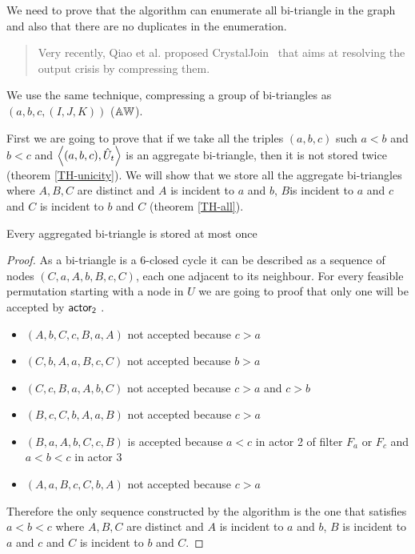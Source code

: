 We need to prove that the algorithm can enumerate all bi-triangle in the graph and also that there are no duplicates in the enumeration.

\begin{quote}
Very recently, Qiao
et al. proposed CrystalJoin~\cite{Lai} that aims at resolving the
output crisis by compressing them.
\end{quote}

We use the same technique, compressing a group of bi-triangles as $(a,b,c,(I,J,K))$ ($\mathbb{AW}$). 
 

First we are going to prove that if we take all the triples $(a,b,c)$  such $a<b$ and $b<c$  and   $\left\langle (a, b,c), \hat{U}_t \right\rangle$ is an aggregate  bi-triangle, then it is not stored twice (theorem \ref{TH-unicity}).  We will show that we  store all the aggregate bi-triangles  where $A,B,C$  are distinct and $A$ is incident to $a$ and $b$, $B$is incident to $a$ and $c$ and $C$ is incident to $b$ and $C$ (theorem \ref{TH-all}). 
\begin{theorem} \label{TH-unicity}Every aggregated bi-triangle is stored  at most once 

\end{theorem}
\begin{proof}
As a bi-triangle is a 6-closed cycle it can be described as a sequence of nodes  $(C,a,A,b,B,c,C)$, each one adjacent to its neighbour. For every feasible permutation  starting with a node in $U$ we are going to proof that only one will be accepted by $\mathsf{actor_2}$ .  
\begin{itemize}
    \item $(A,b,C,c,B,a,A)$ not accepted because $c > a$
    \item $(C,b,A,a,B,c,C)$ not accepted because $b > a$
    \item $(C,c,B,a,A,b,C)$ not accepted because $c > a$ and $c > b$
    \item $(B,c,C,b,A,a,B)$ not accepted because $c > a  $
    \item $(B,a,A,b,C,c,B)$ is accepted because $a < c $ in actor 2 of filter $F_a$ or $F_c$ and $a < b <c$  in actor 3
    \item $(A, a,B,c,C,b,A)$ not accepted because $c > a$
\end{itemize}


Therefore the  only sequence constructed by the algorithm is the one that satisfies $a < b < c $ where $A,B,C$  are distinct and $A$ is incident to $a$ and $b$, $B$ is incident to $a$ and $c$ and $C$ is incident to $b$ and $C$.
\end{proof}


